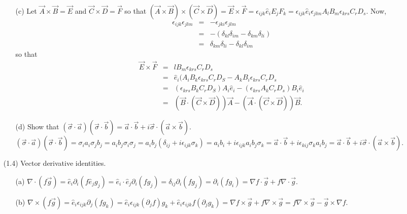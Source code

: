 \documentclass{report}
\begin{document}
\begin{enumerate}
\begin{enumerate}
\item[(c)] Let $\vec{A} \times \vec{B} = \vec{E}$ and $\vec{C} \times 
\vec{D} = \vec{F}$ so that  $(\vec{A} \times \vec{B}) \times (\vec{C} 
\times \vec{D}) = \vec{E} \times \vec{F} = \epsilon_{ijk}\hat{e}_iE_jF_k
= \epsilon_{ijk}\hat{e}_i\epsilon_{jlm}A_lB_m\epsilon_{krs}C_rD_s$. Now,
\begin{eqnarray*}
\epsilon_{ijk}\epsilon_{jlm} &=& -\epsilon_{jki}\epsilon_{jlm} \\
 &=& -(\delta_{kl}\delta_{im} - \delta_{km}\delta_{li}) \\
 &=& \delta_{km}\delta_{li} - \delta_{kl}\delta_{im}
\end{eqnarray*}
so that 
\begin{eqnarray*}
\vec{E} \times \vec{F} &=& lB_m\epsilon_{krs}C_rD_s \\
 &=& \hat{e}_i(A_iB_k\epsilon_{krs}C_rD_S - A_kB_i\epsilon_{krs}C_rD_s\\
 &=& (\epsilon_{krs}B_kC_rD_S)A_i\hat{e}_i - 
     (\epsilon_{krs}A_kC_rD_s)B_i\hat{e}_i \\
 &=& (\vec{B}\cdot(\vec{C} \times \vec{D}))\vec{A} - 
     (\vec{A}\cdot(\vec{C} \times \vec{D}))\vec{B}.
\end{eqnarray*}

\item[(d)] Show that $(\vec{\sigma}\cdot\vec{a})(\vec{\sigma}\cdot\vec{b}) = 
\vec{a}\cdot\vec{b} + i\vec{\sigma}\cdot(\vec{a}\times\vec{b})$.
$(\vec{\sigma}\cdot\vec{a})(\vec{\sigma}\cdot\vec{b}) = \sigma_i a_i \sigma_jb_j
= a_ib_j\sigma_i\sigma_j = a_ib_j(\delta_{ij} + i\epsilon_{ijk}\sigma_k)
= a_ib_i + i\epsilon_{ijk}a_ib_j\sigma_k = \vec{a}\cdot\vec{b} + i\epsilon_{kij}
\sigma_ka_ib_j = \vec{a}\cdot\vec{b} + i\vec{\sigma}\cdot(\vec{a}\times\vec{b})$.
\end{enumerate}

\item[(1.4)] Vector derivative identities.
\begin{enumerate}
\item[(a)] $\nabla\cdot(f\vec{g}) = \hat{e}_i\partial_i(f\hat{e}_jg_j) =
\hat{e}_i\cdot\hat{e}_j\partial_i(fg_j) = \delta_{ij}\partial_i(fg_j) =
\partial_i(fg_i) = \nabla f \cdot\vec{g} + f\nabla\cdot\vec{g}$.

\item[(b)] $\nabla\times(f\vec{g}) = \hat{e}_i\epsilon_{ijk}\partial_j(fg_k)
= \hat{e}_i\epsilon_{ijk}(\partial_j f)g_k + \hat{e}_i\epsilon_{ijk}f
(\partial_jg_k) = \nabla f\times \vec{g} + f\nabla\times\vec{g} = 
f\nabla\times\vec{g} - \vec{g}\times\nabla f$.


\end{enumerate}
\end{enumerate}
\end{document}
